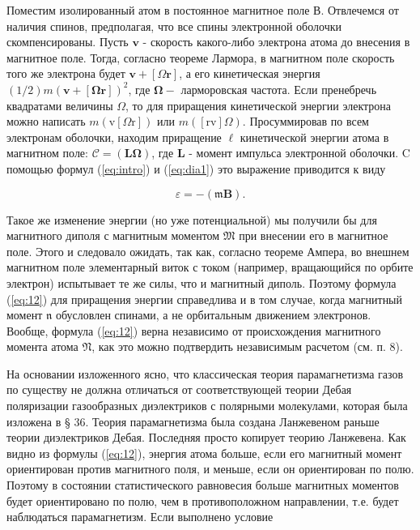 \documentclass[12pt]{article}
\begin{document}
  Поместим изолированный атом в постоянное магнитное поле В. Отвлечемся от наличия спинов, предполагая, что все спины электронной оболочки скомпенсированы. Пусть $\mathbf{v}$ - скорость какого-либо электрона атома до внесения в магнитное поле. Тогда, согласно теореме Лармора, в магнитном поле скорость того же электрона будет $\mathbf{v}+[\Omega \mathbf{r}]$, а его кинетическая энергия $(1 / 2) m(\mathbf{v}+[\boldsymbol{\Omega r}])^2$, где $\boldsymbol{\Omega}-$ ларморовская частота. Если пренебречь квадратами величины $\Omega$, то для приращения кинетической энергии электрона можно написать $m(\mathrm{v}[\Omega \mathrm{r}])$ или $m([\mathrm{rv}] \Omega)$. Просуммировав по всем электронам оболочки, находим приращение $\mathscr{\ell}$ кинетической энергии атома в магнитном поле: $\mathcal{C}=(\mathbf{L} \boldsymbol{\Omega})$, где $\mathbf{L}$ - момент импульса электронной оболочки. C помощью формул (\ref{eq:intro}) и (\ref{eq:dia1}) это выражение приводится к виду

  \begin{equation}
  \label{eq:12}
  \mathscr{\varepsilon}=-(\mathfrak{m} \mathbf{B}) .
  \end{equation}

  Такое же изменение энергии (но уже потенциальной) мы получили бы для магнитного диполя с магнитным моментом $\mathfrak{M}$ при внесении его в магнитное поле. Этого и следовало ожидать, так как, согласно теореме Ампера, во внешнем магнитном поле элементарный виток с током (например, вращающийся по орбите электрон) испытывает те же силы, что и магнитный диполь. Поэтому формула (\ref{eq:12}) для приращения энергии справедлива и в том случае, когда магнитный момент $\mathfrak{n}$ обусловлен спинами, а не орбитальным движением электронов. Вообще, формула (\ref{eq:12}) верна независимо от происхождения магнитного момента атома $\mathfrak{N}$, как это можно подтвердить независимым расчетом (см. п. 8).

  На основании изложенного ясно, что классическая теория парамагнетизма газов по существу не должна отличаться от соответствующей теории Дебая поляризации газообразных диэлектриков с полярными молекулами, которая была изложена в § 36. Теория парамагнетизма была создана Ланжевеном раньше теории диэлектриков Дебая. Последняя просто копирует теорию Ланжевена. Как видно из формулы (\ref{eq:12}), энергия атома больше, если его магнитный момент ориентирован против магнитного поля, и меньше, если он ориентирован по полю. Поэтому в состоянии статистического равновесия больше магнитных моментов будет ориентировано по полю, чем в противоположном направлении, т.е. будет наблюдаться парамагнетизм. Если выполнено условие
\end{document}
